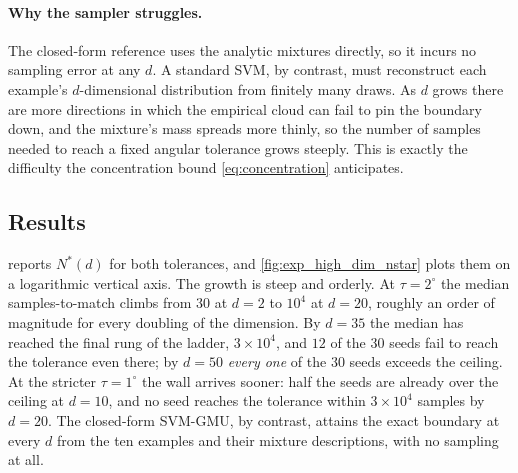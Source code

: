 \documentclass[11pt, letterpaper]{article}
\begin{document}
\paragraph{Why the sampler struggles.} The closed-form reference uses the analytic mixtures directly, so it incurs no sampling error at any $d$. A standard SVM, by contrast, must reconstruct each example's $d$-dimensional distribution from finitely many draws. As $d$ grows there are more directions in which the empirical cloud can fail to pin the boundary down, and the mixture's mass spreads more thinly, so the number of samples needed to reach a fixed angular tolerance grows steeply. This is exactly the difficulty the concentration bound \cref{eq:concentration} anticipates.

\subsection{Results}

 reports $N^\ast(d)$ for both tolerances, and \cref{fig:exp_high_dim_nstar} plots them on a logarithmic vertical axis. The growth is steep and orderly. At $\tau = 2^\circ$ the median samples-to-match climbs from $30$ at $d = 2$ to $10^4$ at $d = 20$, roughly an order of magnitude for every doubling of the dimension. By $d = 35$ the median has reached the final rung of the ladder, $3\times10^4$, and $12$ of the $30$ seeds fail to reach the tolerance even there; by $d = 50$ \emph{every one} of the $30$ seeds exceeds the ceiling. At the stricter $\tau = 1^\circ$ the wall arrives sooner: half the seeds are already over the ceiling at $d = 10$, and no seed reaches the tolerance within $3\times10^4$ samples by $d = 20$. The closed-form SVM-GMU, by contrast, attains the exact boundary at every $d$ from the ten examples and their mixture descriptions, with no sampling at all.
\end{document}
